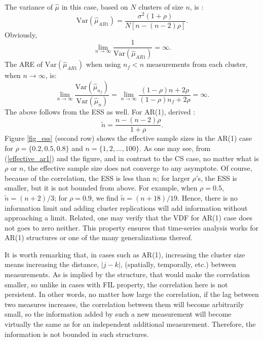 \documentclass[11pt,a5paper,twoside]{book}
\begin{document}
The variance of $\widehat{\mu}$ in this case, based on $N$ clusters of size $n$, is \cite{hermans2017_ar1}:
\begin{equation}
\label{var_mu_ar1}
\mathrm{Var}(\widehat{\mu}_{AR1})= \frac{\sigma^2 (1+\rho)}{N [n-(n-2)\rho]}.
\end{equation}
Obviously, 
\begin{equation}
\label{info_ar1}
\lim_{n\rightarrow\infty} \frac{1}{\mathrm{Var}(\widehat{\mu}_{AR1})} = \infty.
\end{equation}
The ARE of $\mathrm{Var}(\widehat{\mu}_{AR1})$ when using $n_f <n$ measurements from each cluster, when $n\rightarrow\infty$, is:
\begin{equation}
\label{eff_ar1}
\lim_{n\rightarrow\infty} \frac{\mathrm{Var}(\widehat{\mu}_{n_f})}{\mathrm{Var}(\widehat{\mu}_n)} = \lim_{n\rightarrow\infty} \frac{(1-\rho) n + 2\rho}{(1-\rho) n _f + 2\rho} = \infty.
\end{equation}
The above follows from the ESS as well. For AR(1), derived \cite{faes2009}:
\begin{equation}
\label{effective_ar1}
\widetilde{n}=\frac{n-(n-2)\rho}{1+\rho}.
\end{equation}
Figure \ref{fig_ess} (second row) shows the effective sample sizes in the AR(1) case for $\rho=\{0.2,0.5,0.8\}$ and $n=\{1,2,\ldots,100\}$. As one may see, from (\ref{effective_ar1}) and the figure, and in contrast to the CS case, no matter what is $\rho$ or $n$, the effective sample size does not converge to any asymptote. Of course, because of the correlation, the ESS is less than $n$; for larger $\rho$'s, the ESS is smaller, but it is not bounded from above. For example, when $\rho=0.5$, $\widetilde{n}=(n+2)/3$; for $\rho=0.9$, we find $\widetilde{n}=(n+18)/19$. Hence, there is no information limit and adding cluster replications will add information without approaching a limit. Related, one may  verify that the VDF for AR(1) case does not goes to zero neither. This property ensures that time-series analysis works for AR(1) structures or one of the many generalizations thereof.

It is worth remarking that, in cases such as AR(1), increasing the cluster size means increasing the distance, $|j-k|$, (spatially, temporally, etc.) between measurements. As is implied by the structure, that would make the correlation smaller, so unlike in cases with FIL property, the correlation here is not persistent. In other words, no matter how large the correlation, if the lag between two measures increases, the correlation between them will become arbitrarily small, so the information added by such a new measurement will become virtually the same as for an independent additional measurement. Therefore, the information is not bounded in such structures.
\end{document}
